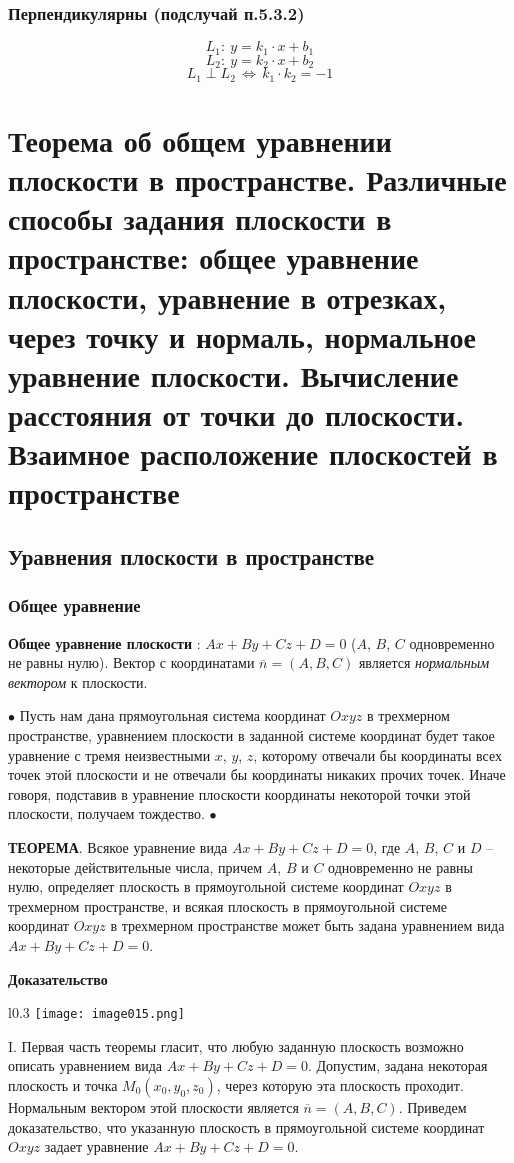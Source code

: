 \documentclass{article}
\begin{document}
\subsubsection{Перпендикулярны (подслучай п.5.3.2)}
    $$ L_1:\:y=k_1\cdot x+b_1 $$
    $$ L_2:\:y=k_2\cdot x+b_2 $$
    $$ L_1\perp L_2\,\Leftrightarrow\, k_1\cdot k_2=-1 $$

\newpage
\section{Теорема об общем уравнении плоскости в пространстве. Различные способы задания плоскости в пространстве: общее уравнение плоскости, уравнение в отрезках, через точку и нормаль, нормальное уравнение плоскости. Вычисление расстояния от точки до плоскости. Взаимное расположение плоскостей в пространстве}
\subsection{Уравнения плоскости в пространстве}
\subsubsection{Общее уравнение}
\textbf{Общее уравнение плоскости} : $Ax + By + Cz + D = 0$ ($A$, $B$, $C$ одновременно не равны
нулю). Вектор с координатами $\overline{n}=(A, B, C)$ является \textit{нормальным вектором} к плоскости.

$\bullet$ Пусть нам дана прямоугольная система координат $Oxyz$ в трехмерном пространстве, уравнением плоскости в заданной системе координат будет такое уравнение с тремя неизвестными $x$, $y$, $z$, которому отвечали бы координаты всех точек этой плоскости и не отвечали бы координаты никаких прочих точек. Иначе говоря, подставив в уравнение плоскости координаты некоторой точки этой плоскости, получаем тождество. $\bullet$

\textbf{ТЕОРЕМА}. Всякое уравнение вида $Ax+By+Cz+D=0$, где $A$, $B$, $C$ и $D$ -- некоторые действительные числа, причем $A$, $B$ и $C$ одновременно не равны нулю, определяет плоскость в прямоугольной системе координат $Oxyz$ в трехмерном пространстве, и всякая плоскость в прямоугольной системе координат $Oxyz$ в трехмерном пространстве может быть задана уравнением вида $Ax+By+Cz+D=0$.

\textbf{Доказательство}

\begin{wrapfigure}{l}{0.3\textwidth}
    \centering
    \texttt{[image: image015.png]}
\end{wrapfigure}
I. Первая часть теоремы гласит, что любую заданную плоскость возможно описать уравнением вида $Ax+By+Cz+D=0$. Допустим, задана некоторая плоскость и точка $M_0(x_0,y_0,z_0)$, через которую эта плоскость проходит. Нормальным вектором этой плоскости является $\overline{n}=(A,B,C)$. Приведем доказательство, что указанную плоскость в прямоугольной системе координат $Oxyz$
задает уравнение $Ax+By+Cz+D=0$.
\end{document}
